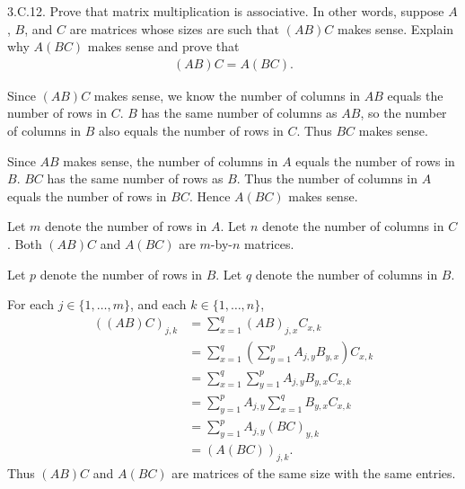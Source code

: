 \documentclass[a5paper]{article}
\begin{document}
\newcommand   \C           {\mathbf{C}}
\newcommand   \R           {\mathbf{R}}
\renewcommand \L           {\mathcal{L}}
\newcommand   \F           {\mathbf{F}}
\renewcommand \P           {\mathcal{P}}
\newcommand   \M           {\mathcal{M}}
\newcommand   \op          {\operatorname}


    3.C.12.
    Prove that matrix multiplication is associative.
    In other words, suppose $A$, $B$, and $C$ are matrices whose sizes are such that $(AB)C$ makes sense.
    Explain why $A(BC)$ makes sense and prove that
\begin{align*}
        (AB)C = A(BC) .
\end{align*}

    Since $(AB)C$ makes sense, we know the number of columns in $AB$ equals the number of rows in $C$.
    $B$ has the same number of columns as $AB$, so the number of columns in $B$ also equals the number of rows in $C$.
    Thus $BC$ makes sense.

    Since $AB$ makes sense, the number of columns in $A$ equals the number of rows in $B$.
    $BC$ has the same number of rows as $B$.
    Thus the number of columns in $A$ equals the number of rows in $BC$.
    Hence $A(BC)$ makes sense.

    Let $m$ denote the number of rows in $A$. Let $n$ denote the number of columns in $C$.
    Both $(AB)C$ and $A(BC)$ are $m$-by-$n$ matrices.

%
%

    Let $p$ denote the number of rows in $B$.
    Let $q$ denote the number of columns in $B$.

    For each $j \in \{1,\dots,m\}$,  and each $k \in \{1,\dots,n\}$,
\begin{align*}
        ((AB)C)_{j,k} &= \sum_{x=1}^q (AB)_{j,x} C_{x,k} \\
                      &= \sum_{x=1}^q ( \sum_{y=1}^p A_{j,y} B_{y,x} ) C_{x,k} \\
                      &= \sum_{x=1}^q \sum_{y=1}^p A_{j,y} B_{y,x} C_{x,k} \\
                      &= \sum_{y=1}^p A_{j,y} \sum_{x=1}^q B_{y,x} C_{x,k} \\
                      &= \sum_{y=1}^p A_{j,y} (BC)_{y,k} \\
                      &= (A(BC))_{j,k} .
\end{align*}
    Thus $(AB)C$ and $A(BC)$ are matrices of the same size with the same entries.
\end{document}
